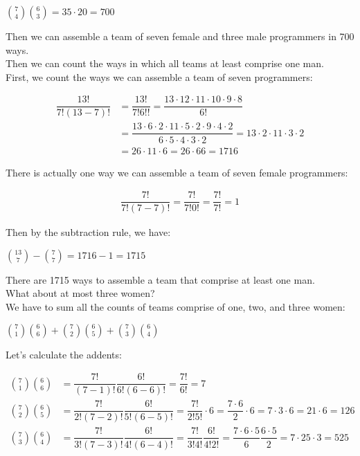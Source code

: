 \documentclass{report}
\newcommand{\cent}[1]{\begin{center}#1\end{center}}
\newcommand{\mAlign}[1]{\begin{align*}#1\end{align*}}
\begin{document}
{	 	\cent{$ \binom{7}{4} \binom{6}{3} = 35 \cdot 20 = 700$}
	 	
	 	Then we can assemble a team of seven female and three male programmers in 700 ways.\\
	 	
	 	Then we can count the ways in which all teams at least comprise one man. \\
	 	
	 	First, we count the ways we can assemble a team of seven programmers:
	 	
	 	\mAlign{
	 		\dfrac{13!}{7!(13-7)!} &= \dfrac{13!}{7!6!!} = \dfrac{13 \cdot 12 \cdot 11 \cdot  10 \cdot 9 \cdot  8 }{6!} \\
	 		&= \dfrac{13 \cdot 6 \cdot 2 \cdot 11 \cdot  5 \cdot 2 \cdot 9 \cdot  4 \cdot 2 }{6 \cdot 5 \cdot 4 \cdot 3 \cdot 2} = 13 \cdot 2 \cdot 11 \cdot 3 \cdot  2 \\
	 		&= 26 \cdot 11 \cdot 6 = 26 \cdot 66 = 1716
	 	}
		
		There is actually one way we can assemble a team of seven female programmers:
		
		\mAlign{
			\dfrac{7!}{7!(7-7)!} = \dfrac{7!}{7!0!} = \dfrac{7!}{7!} = 1
		} 	
		
		Then by the subtraction rule, we have:
		
		\cent{$\binom{13}{7} - \binom{7}{7} = 1716-1 = 1715$}
		
		There are 1715 ways to assemble a team that comprise at least one man.\\
		
		What about at most three women?\\
		
		We have to sum all the counts of teams comprise of one, two, and three women:
		
		\cent{$\binom{7}{1}\binom{6}{6}+\binom{7}{2}\binom{6}{5} + \binom{7}{3}\binom{6}{4}$}
		
		Let's calculate the addents:
		
		\mAlign{
			\binom{7}{1}\binom{6}{6} &= \dfrac{7!}{(7-1)!} \dfrac{6!}{6!(6-6)!} = \dfrac{7!}{6!} = 7 \\
			\binom{7}{2} \binom{6}{5} &= \dfrac{7!}{2!(7-2)!} \dfrac{6!}{5!(6-5)!} = \dfrac{7!}{2!5!} \cdot 6 = \dfrac{7 \cdot 6}{2} \cdot 6 = 7 \cdot 3 \cdot 6 = 21 \cdot 6 = 126 \\
			\binom{7}{3} \binom{6}{4} &= \dfrac{7!}{3!(7-3)!} \dfrac{6!}{4!(6-4)!} = \dfrac{7!}{3!4!} \dfrac{6!}{4!2!} = \dfrac{7 \cdot 6 \cdot 5}{6} \dfrac{6 \cdot 5 }{2} = 7 \cdot 25 \cdot 3 = 525
		}
		
}
\end{document}

